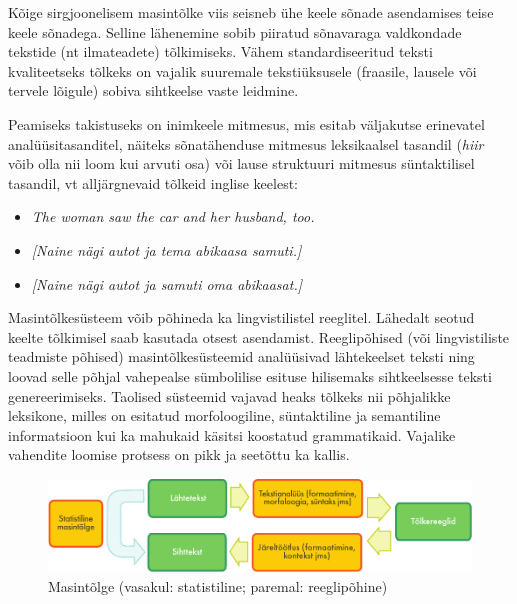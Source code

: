 \begin{multicols}{2}
Kõige sirgjoonelisem masintõlke viis seisneb ühe keele sõnade asendamises teise keele sõnadega.  Selline lähenemine sobib piiratud sõnavaraga valdkondade tekstide (nt ilmateadete) tõlkimiseks.  Vähem standardiseeritud teksti kvaliteetseks tõlkeks on vajalik suuremale tekstiüksusele (fraasile, lausele või tervele lõigule) sobiva sihtkeelse vaste leidmine.

Peamiseks takistuseks on inimkeele mitmesus, mis esitab väljakutse erinevatel analüüsitasanditel, näiteks sõnatähenduse mitmesus leksikaalsel tasandil (\textit{hiir} võib olla nii loom kui arvuti osa) või lause struktuuri mitmesus süntaktilisel tasandil, vt alljärgnevaid tõlkeid inglise keelest:

\begin{itemize}
\item[] \textit{The woman saw the car and her husband, too.}
\item \textit{[Naine nägi autot ja tema abikaasa samuti.]}
\item \textit{[Naine nägi autot ja samuti oma abikaasat.]}
\end{itemize}

Masintõlkesüsteem võib põhineda ka lingvistilistel reeglitel. 
Lähedalt seotud keelte tõlkimisel saab kasutada otsest asendamist. 
Reeglipõhised (või lingvistiliste teadmiste põhised) masintõlkesüsteemid analüüsivad lähtekeelset teksti ning loovad selle põhjal vahepealse sümbolilise esituse hilisemaks sihtkeelsesse teksti genereerimiseks. 
Taolised süsteemid vajavad heaks tõlkeks nii põhjalikke leksikone, milles on esitatud morfoloogiline, süntaktiline ja semantiline informatsioon kui ka mahukaid käsitsi koostatud grammatikaid. 
Vajalike vahendite loomise protsess on pikk ja seetõttu ka kallis. 

\begin{figure}[htb]
  \center
  \includegraphics[width=\textwidth]{../_media/estonian/machine_translation}
  \caption{Masintõlge (vasakul: statistiline; paremal: reeglipõhine)}
  \label{fig:mtarch_ee}
\end{figure}


\end{multicols}
